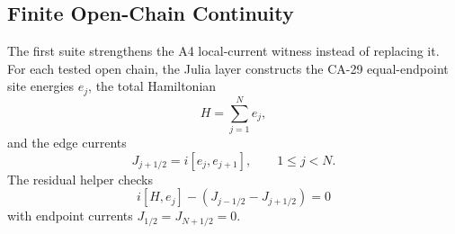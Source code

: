 
\subsection{Finite Open-Chain Continuity}

The first suite strengthens the A4 local-current witness instead of replacing
it.  For each tested open chain, the Julia layer constructs the CA-29
equal-endpoint site energies \(e_j\), the total Hamiltonian
\[
  H=\sum_{j=1}^N e_j,
\]
and the edge currents
\[
  J_{j+1/2}=i[e_j,e_{j+1}],
  \qquad 1\le j<N .
\]
The residual helper checks
\[
  i[H,e_j]-(J_{j-1/2}-J_{j+1/2})=0
\]
with endpoint currents \(J_{1/2}=J_{N+1/2}=0\).

